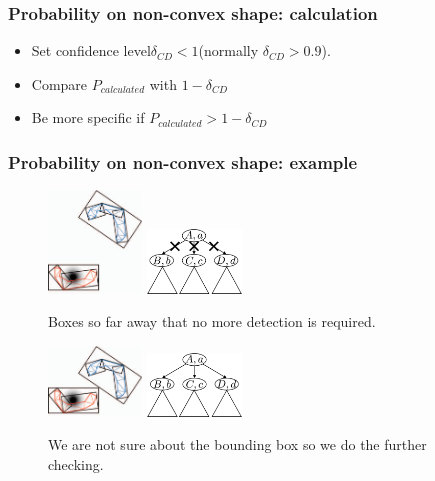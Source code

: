 \documentclass{beamer}
\begin{document}
\begin{frame}
	\frametitle{Probability on non-convex shape: calculation}
	\begin{itemize}
		\item Set confidence level$\delta_{CD} < 1$(normally $\delta_{CD} > 0.9$).
		\item Compare $P_{calculated}$ with $1-\delta_{CD}$
		\item Be more specific if $P_{calculated} > 1-\delta_{CD}$
	\end{itemize}
\end{frame}

\begin{frame}
	\frametitle{Probability on non-convex shape: example}
	\begin{figure}	
		\includegraphics[width=2.5cm]{imgs/b.png}
		\includegraphics[width=2.5cm]{imgs/c.png}
		\caption{Boxes so far away that no more detection is required.}
	\end{figure}
	\begin{figure}	
		\includegraphics[width=2.5cm]{imgs/d.png}
		\includegraphics[width=2.5cm]{imgs/e.png}
		\caption{We are not sure about the bounding box so we do the further checking.}
	\end{figure}
\end{frame}
\end{document}
